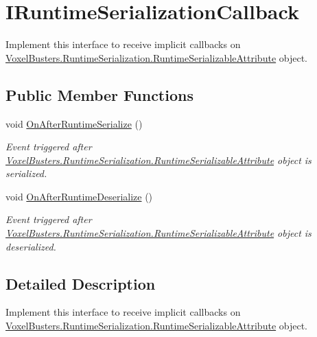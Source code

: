 \hypertarget{interface_voxel_busters_1_1_runtime_serialization_1_1_i_runtime_serialization_callback}{}\section{I\+Runtime\+Serialization\+Callback}
\label{interface_voxel_busters_1_1_runtime_serialization_1_1_i_runtime_serialization_callback}


Implement this interface to receive implicit callbacks on \hyperlink{class_voxel_busters_1_1_runtime_serialization_1_1_runtime_serializable_attribute}{Voxel\+Busters.\+Runtime\+Serialization.\+Runtime\+Serializable\+Attribute} object.  


\subsection*{Public Member Functions}
\begin{DoxyCompactItemize}
\item 
void \hyperlink{interface_voxel_busters_1_1_runtime_serialization_1_1_i_runtime_serialization_callback_aac1895404ac627f90f5c2da1e0168430}{On\+After\+Runtime\+Serialize} ()
\begin{DoxyCompactList}\small\item\em Event triggered after \hyperlink{class_voxel_busters_1_1_runtime_serialization_1_1_runtime_serializable_attribute}{Voxel\+Busters.\+Runtime\+Serialization.\+Runtime\+Serializable\+Attribute} object is serialized. \end{DoxyCompactList}\item 
void \hyperlink{interface_voxel_busters_1_1_runtime_serialization_1_1_i_runtime_serialization_callback_ae69d517ef3e44fb508e804a576a0ad36}{On\+After\+Runtime\+Deserialize} ()
\begin{DoxyCompactList}\small\item\em Event triggered after \hyperlink{class_voxel_busters_1_1_runtime_serialization_1_1_runtime_serializable_attribute}{Voxel\+Busters.\+Runtime\+Serialization.\+Runtime\+Serializable\+Attribute} object is deserialized. \end{DoxyCompactList}\end{DoxyCompactItemize}


\subsection{Detailed Description}
Implement this interface to receive implicit callbacks on \hyperlink{class_voxel_busters_1_1_runtime_serialization_1_1_runtime_serializable_attribute}{Voxel\+Busters.\+Runtime\+Serialization.\+Runtime\+Serializable\+Attribute} object. 



